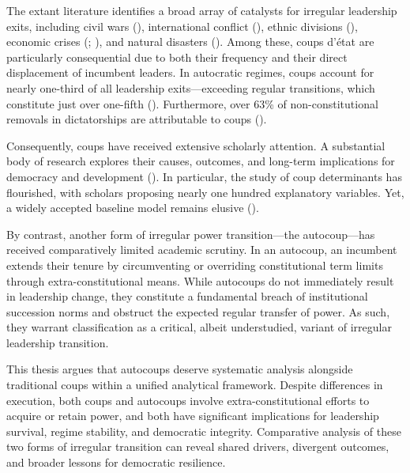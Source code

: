 \documentclass[
  12pt,
]{report}
\begin{document}
The extant literature identifies a broad array of catalysts for
irregular leadership exits, including civil wars
(), international
conflict (),
ethnic divisions (), economic crises (;
), and natural
disasters (). Among these, coups d'état are particularly consequential due to
both their frequency and their direct displacement of incumbent leaders.
In autocratic regimes, coups account for nearly one-third of all
leadership exits---exceeding regular transitions, which constitute just
over one-fifth ().
Furthermore, over 63\% of non-constitutional removals in dictatorships
are attributable to coups ().

Consequently, coups have received extensive scholarly attention. A
substantial body of research explores their causes, outcomes, and
long-term implications for democracy and development
(). In particular, the
study of coup determinants has flourished, with scholars proposing
nearly one hundred explanatory variables. Yet, a widely accepted
baseline model remains elusive ().

By contrast, another form of irregular power transition---the
autocoup---has received comparatively limited academic scrutiny. In an
autocoup, an incumbent extends their tenure by circumventing or
overriding constitutional term limits through extra-constitutional
means. While autocoups do not immediately result in leadership change,
they constitute a fundamental breach of institutional succession norms
and obstruct the expected regular transfer of power. As such, they
warrant classification as a critical, albeit understudied, variant of
irregular leadership transition.

This thesis argues that autocoups deserve systematic analysis alongside
traditional coups within a unified analytical framework. Despite
differences in execution, both coups and autocoups involve
extra-constitutional efforts to acquire or retain power, and both have
significant implications for leadership survival, regime stability, and
democratic integrity. Comparative analysis of these two forms of
irregular transition can reveal shared drivers, divergent outcomes, and
broader lessons for democratic resilience.
\end{document}

